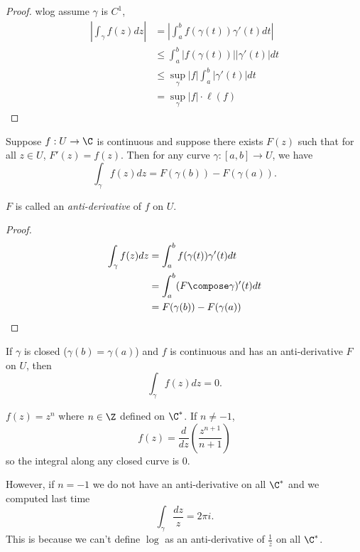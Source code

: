 \documentclass[a4paper]{article}
\begin{document}
\begin{proof}
  wlog assume \(\gamma\) is \(C^1\),
  \begin{align*}
    \left| \int_\gamma f(z)dz \right| &= \left| \int_a^bf(\gamma(t))\gamma'(t)dt \right| \\
                                      &\leq \int_a^b |f(\gamma(t))||\gamma'(t)| dt \\
                                      &\leq \sup_\gamma|f| \int_a^b |\gamma'(t)| dt \\
                                      &= \sup_\gamma|f| \cdot \ell(f)
  \end{align*}
\end{proof}

\begin{theorem}
  Suppose \(f: U \to \C\) is continuous and suppose there exists \(F(z)\) such that for all \(z \in U\), \(F'(z) = f(z)\). Then for any curve \(\gamma: [a, b] \to U\), we have
  \[
    \int_\gamma f(z) dz = F(\gamma(b)) - F(\gamma(a)).
  \]
\end{theorem}

\begin{note}
  \(F\) is called an \emph{anti-derivative} of \(f\) on \(U\).
\end{note}

\begin{proof}
  \begin{align*}
    \int_\gamma f(z)dz
    &= \int_a^b f(\gamma(t))\gamma'(t) dt \\
    &= \int_a^b (F \compose \gamma)'(t) dt \\
    &= F(\gamma(b)) - F(\gamma(a))
  \end{align*}
\end{proof}

\begin{corollary}
  If \(\gamma\) is closed (\(\gamma(b) = \gamma(a)\)) and \(f\) is continuous and has an anti-derivative \(F\) on  \(U\), then
  \[
    \int_\gamma f(z)dz = 0.
  \]
\end{corollary}

\begin{eg}
  \(f(z) = z^n\) where \(n \in \Z\) defined on \(\C^*\). If \(n \neq -1\),
  \[
    f(z) = \frac{d}{dz} \left( \frac{z^{n + 1}}{n + 1} \right)
  \]
  so the integral along any closed curve is \(0\).

  However, if \(n = -1\) we do not have an anti-derivative on all \(\C^*\) and we computed last time
  \[
    \int_\gamma \frac{dz}{z} = 2\pi i.
  \]
  This is because we can't define \(\log\) as an anti-derivative of \(\frac{1}{z}\) on all \(\C^*\).
\end{eg}
\end{document}
